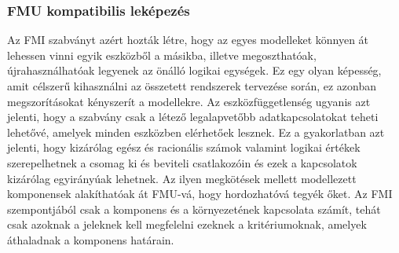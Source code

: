         \subsubsection{FMU kompatibilis leképezés}
            Az FMI szabványt azért hozták létre, hogy az egyes modelleket könnyen át lehessen vinni egyik eszközből a másikba, illetve megoszthatóak, újrahasználhatóak legyenek az önálló logikai egységek.
            Ez egy olyan képesség, amit célszerű kihasználni az összetett rendszerek tervezése során, ez azonban megszorításokat kényszerít a modellekre.
            Az eszközfüggetlenség ugyanis azt jelenti, hogy a szabvány csak a létező legalapvetőbb adatkapcsolatokat teheti lehetővé, amelyek minden eszközben elérhetőek lesznek.
            Ez a gyakorlatban azt jelenti, hogy kizárólag egész és racionális számok valamint logikai értékek szerepelhetnek a csomag ki és beviteli csatlakozóin és ezek a kapcsolatok kizárólag egyirányúak lehetnek.
            Az ilyen megkötések mellett modellezett komponensek alakíthatóak át FMU-vá, hogy hordozhatóvá tegyék őket.
            Az FMI szempontjából csak a komponens és a környezetének kapcsolata számít, tehát csak azoknak a jeleknek kell megfelelni ezeknek a kritériumoknak, amelyek áthaladnak a komponens határain.

